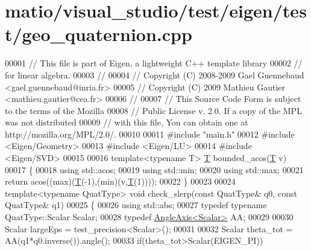 \hypertarget{matio_2visual__studio_2test_2eigen_2test_2geo__quaternion_8cpp_source}{}\section{matio/visual\+\_\+studio/test/eigen/test/geo\+\_\+quaternion.cpp}
\label{matio_2visual__studio_2test_2eigen_2test_2geo__quaternion_8cpp_source}

\begin{DoxyCode}
00001 \textcolor{comment}{// This file is part of Eigen, a lightweight C++ template library}
00002 \textcolor{comment}{// for linear algebra.}
00003 \textcolor{comment}{//}
00004 \textcolor{comment}{// Copyright (C) 2008-2009 Gael Guennebaud <gael.guennebaud@inria.fr>}
00005 \textcolor{comment}{// Copyright (C) 2009 Mathieu Gautier <mathieu.gautier@cea.fr>}
00006 \textcolor{comment}{//}
00007 \textcolor{comment}{// This Source Code Form is subject to the terms of the Mozilla}
00008 \textcolor{comment}{// Public License v. 2.0. If a copy of the MPL was not distributed}
00009 \textcolor{comment}{// with this file, You can obtain one at http://mozilla.org/MPL/2.0/.}
00010 
00011 \textcolor{preprocessor}{#include "main.h"}
00012 \textcolor{preprocessor}{#include <Eigen/Geometry>}
00013 \textcolor{preprocessor}{#include <Eigen/LU>}
00014 \textcolor{preprocessor}{#include <Eigen/SVD>}
00015 
00016 \textcolor{keyword}{template}<\textcolor{keyword}{typename} T> \hyperlink{group___sparse_core___module}{T} bounded\_acos(\hyperlink{group___sparse_core___module}{T} v)
00017 \{
00018   \textcolor{keyword}{using} std::acos;
00019   \textcolor{keyword}{using} std::min;
00020   \textcolor{keyword}{using} std::max;
00021   \textcolor{keywordflow}{return} acos((max)(\hyperlink{group___sparse_core___module}{T}(-1),(min)(v,\hyperlink{group___sparse_core___module}{T}(1))));
00022 \}
00023 
00024 \textcolor{keyword}{template}<\textcolor{keyword}{typename} QuatType> \textcolor{keywordtype}{void} check\_slerp(\textcolor{keyword}{const} QuatType& q0, \textcolor{keyword}{const} QuatType& q1)
00025 \{
00026   \textcolor{keyword}{using} std::abs;
00027   \textcolor{keyword}{typedef} \textcolor{keyword}{typename} QuatType::Scalar Scalar;
00028   \textcolor{keyword}{typedef} \hyperlink{group___geometry___module_class_eigen_1_1_angle_axis}{AngleAxis<Scalar>} AA;
00029 
00030   Scalar largeEps = test\_precision<Scalar>();
00031 
00032   Scalar theta\_tot = AA(q1*q0.inverse()).angle();
00033   \textcolor{keywordflow}{if}(theta\_tot>Scalar(EIGEN\_PI))

\end{DoxyCode}
